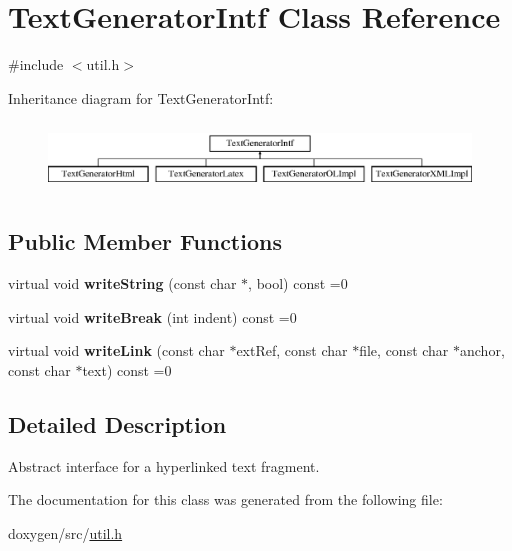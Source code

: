 \hypertarget{class_text_generator_intf}{}\section{Text\+Generator\+Intf Class Reference}
\label{class_text_generator_intf}


{\ttfamily \#include $<$util.\+h$>$}

Inheritance diagram for Text\+Generator\+Intf\+:\begin{figure}[H]
\begin{center}
\leavevmode
\includegraphics[height=1.879195cm]{class_text_generator_intf}
\end{center}
\end{figure}
\subsection*{Public Member Functions}
\begin{DoxyCompactItemize}
\item 
\mbox{\label{class_text_generator_intf_aba1dd89729760fe7d4b37b916870f297}} 
virtual void {\bfseries write\+String} (const char $\ast$, bool) const =0
\item 
\mbox{\label{class_text_generator_intf_a5367063112c94eece527eddf1cd9b978}} 
virtual void {\bfseries write\+Break} (int indent) const =0
\item 
\mbox{\label{class_text_generator_intf_a5a648a078ee39640544d371c1cc747f6}} 
virtual void {\bfseries write\+Link} (const char $\ast$ext\+Ref, const char $\ast$file, const char $\ast$anchor, const char $\ast$text) const =0
\end{DoxyCompactItemize}


\subsection{Detailed Description}
Abstract interface for a hyperlinked text fragment. 

The documentation for this class was generated from the following file\+:\begin{DoxyCompactItemize}
\item 
doxygen/src/\mbox{\hyperlink{util_8h}{util.\+h}}\end{DoxyCompactItemize}
